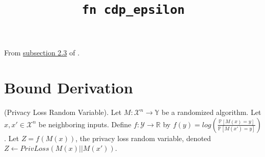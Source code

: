 


\title{\texttt{fn cdp\_epsilon}}
\author{}


\maketitle

From \href{https://arxiv.org/pdf/2004.00010.pdf#subsection.2.3}{subsection 2.3} of \cite{CKS20}.




\section{Bound Derivation}

\begin{definition}
\label{plrv}
(Privacy Loss Random Variable). 
Let $M: \mathcal{X}^n \rightarrow \mathbb{Y}$ be a randomized algorithm.
Let $x, x' \in \mathcal{X}^n$ be neighboring inputs.
Define $f: \mathcal{Y} \rightarrow \mathbb{R}$ by $f(y) = log \left( \frac{\mathbb{P}[M(x)=y]}{\mathbb{P}[M(x')=y]} \right)$.
Let $Z = f(M(x))$, the privacy loss random variable, denoted $Z \leftarrow PrivLoss(M(x) || M(x'))$.
\end{definition}

